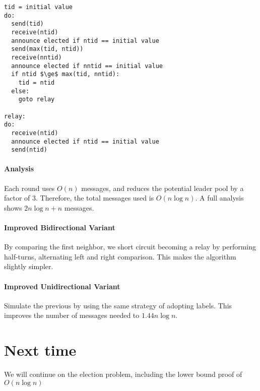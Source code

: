 \documentclass{idc_msc}
\begin{document}
\begin{lstlisting}[frame=L,mathescape=true,title={For processes $i=1...n$}]
tid = initial value
do:
  send(tid)
  receive(ntid)
  announce elected if ntid == initial value
  send(max(tid, ntid))
  receive(nntid)
  announce elected if nntid == initial value
  if ntid $\ge$ max(tid, nntid):
    tid = ntid
  else:
    goto relay

relay:
do:
  receive(ntid)
  announce elected if ntid == initial value
  send(ntid)
\end{lstlisting}

\paragraph{Analysis}
Each round uses $O(n)$ messages, and reduces the potential leader pool by a factor of $3$.
Therefore, the total messages used is $O(n \log n)$.
A full analysis shows $2n \log n + n$ messages.

\paragraph{Improved Bidirectional Variant}
By comparing the first neighbor, we short circuit becoming a relay by performing half-turns, alternating left and right comparison.
This makes the algorithm slightly simpler.

\paragraph{Improved Unidirectional Variant}
Simulate the previous by using the same strategy of adopting labels.
This improves the number of messages needed to $1.44 n \log n$.

\section{Next time}
We will continue on the election problem, including the lower bound proof of $O(n\log n)$
\end{document}
